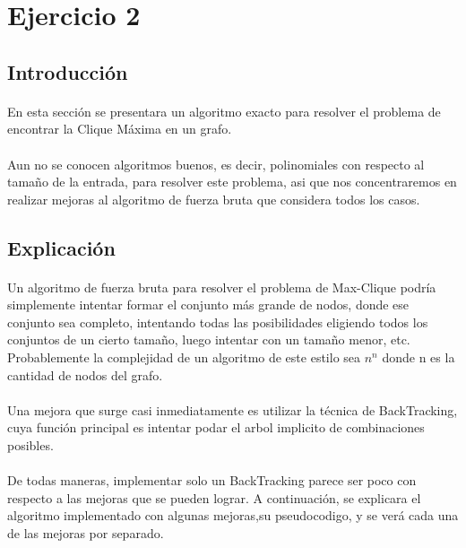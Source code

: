 \section{Ejercicio 2}

\subsection{Introducción}

\paragraph{}
En esta sección se presentara un algoritmo exacto para resolver el problema de encontrar la Clique Máxima en un grafo.


\paragraph{}
Aun no se conocen algoritmos buenos, es decir, polinomiales con respecto al tamaño de la entrada, para resolver 
este problema, asi que nos concentraremos en realizar mejoras al algoritmo de fuerza bruta que considera todos los casos.


\subsection{Explicación}

\paragraph{}
Un algoritmo de fuerza bruta para resolver el problema de Max-Clique podría simplemente intentar formar el conjunto más 
grande de nodos, donde ese conjunto sea completo, intentando todas las posibilidades eligiendo todos los conjuntos de un cierto tamaño,
luego intentar con un tamaño menor, etc. Probablemente la complejidad de un algoritmo de este estilo sea $n^n$ donde n es la cantidad 
de nodos del grafo.

\paragraph{}
Una mejora que surge casi inmediatamente es utilizar la técnica de BackTracking, cuya función principal es intentar podar el 
arbol implicito de combinaciones posibles. 

\paragraph{}
De todas maneras, implementar solo un BackTracking parece ser poco con respecto a las mejoras que se pueden lograr. A continuación, se explicara el algoritmo implementado con algunas mejoras,su pseudocodigo, y se verá cada una de las mejoras por separado.

